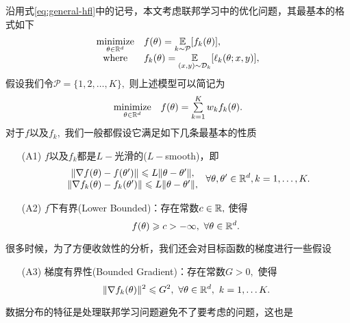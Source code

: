 沿用式\eqref{eq:general-hfl}中的记号，本文考虑联邦学习中的优化问题，其最基本的格式如下
\begin{equation}
\label{eq:fl-basic-dist}
\begin{array}{cl}
\operatorname*{minimize}\limits_{\theta \in \mathbb{R}^d} & f(\theta) = \operatorname*{\mathbb{E}}\limits_{k \sim {\mathcal{P}}} [f_k(\theta)], \\
\text{where} & f_k(\theta) = \operatorname*{\mathbb{E}}\limits_{(x, y) \sim \mathcal{D}_k} [\ell_k(\theta; x, y)],
\end{array}
\end{equation}
假设我们令$\mathcal{P} = \{1, 2, \ldots, K\},$ 则上述模型可以简记为
\begin{equation}
\label{eq:fl-basic}
\begin{array}{cl}
\operatorname*{minimize}\limits_{\theta \in \mathbb{R}^d} & f(\theta) = \sum\limits_{k=1}^K w_k f_k(\theta).
\end{array}
\end{equation}
对于$f$以及$f_k,$ 我们一般都假设它满足如下几条最基本的性质
\begin{itemize}
    \item[(A1)] $f$以及$f_k$都是$L-$光滑的($L-$smooth)，即
    \begin{equation}
    \label{eq:l-smooth}
    \begin{array}{c}
    \lVert \nabla f (\theta) - f (\theta') \rVert \leqslant L \lVert \theta - \theta' \rVert, \\
    \lVert \nabla f_k (\theta) - f_k (\theta') \rVert \leqslant L \lVert \theta - \theta' \rVert,
    \end{array}
    ~ \forall \theta, \theta' \in \mathbb{R}^d, k = 1, \ldots, K.
    \end{equation}
    \item[(A2)] $f$下有界(Lower Bounded)：存在常数$c \in \mathbb{R},$ 使得
    \begin{equation}
    \label{eq:lower-bounded}
    f(\theta) \geqslant c > -\infty, ~ \forall \theta \in \mathbb{R}^d.
    \end{equation}
\end{itemize}
很多时候，为了方便收敛性的分析，我们还会对目标函数的梯度进行一些假设
\begin{itemize}
    \item[(A3)] 梯度有界性(Bounded Gradient)：存在常数$G > 0,$ 使得
    \begin{equation*}
        \lVert \nabla f_k (\theta) \rVert^2 \leqslant G^2, ~ \forall \theta \in \mathbb{R}^d, ~ k = 1, \ldots K.
    \end{equation*}
\end{itemize}
数据分布的特征是处理联邦学习问题避免不了要考虑的问题，这也是

